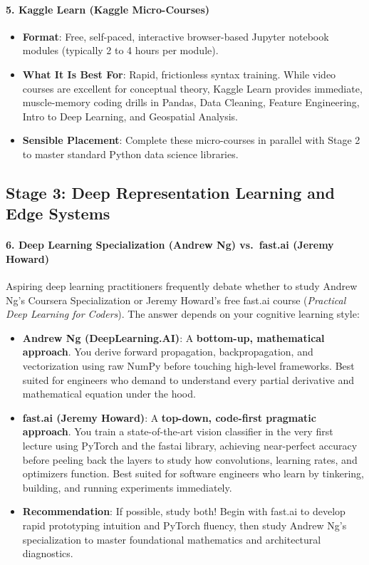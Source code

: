 \paragraph{5. Kaggle Learn (Kaggle Micro-Courses)}
\begin{itemize}
    \item \textbf{Format}: Free, self-paced, interactive browser-based Jupyter notebook modules (typically 2 to 4 hours per module).
    \item \textbf{What It Is Best For}: Rapid, frictionless syntax training. While video courses are excellent for conceptual theory, Kaggle Learn provides immediate, muscle-memory coding drills in Pandas, Data Cleaning, Feature Engineering, Intro to Deep Learning, and Geospatial Analysis.
    \item \textbf{Sensible Placement}: Complete these micro-courses in parallel with Stage 2 to master standard Python data science libraries.
\end{itemize}

\subsection{Stage 3: Deep Representation Learning and Edge Systems}

\paragraph{6. Deep Learning Specialization (Andrew Ng) vs.\ fast.ai (Jeremy Howard)}
Aspiring deep learning practitioners frequently debate whether to study Andrew Ng's Coursera Specialization or Jeremy Howard's free fast.ai course (\emph{Practical Deep Learning for Coders}). The answer depends on your cognitive learning style:
\begin{itemize}
    \item \textbf{Andrew Ng (DeepLearning.AI)}: A \textbf{bottom-up, mathematical approach}. You derive forward propagation, backpropagation, and vectorization using raw NumPy before touching high-level frameworks. Best suited for engineers who demand to understand every partial derivative and mathematical equation under the hood.
    \item \textbf{fast.ai (Jeremy Howard)}: A \textbf{top-down, code-first pragmatic approach}. You train a state-of-the-art vision classifier in the very first lecture using PyTorch and the fastai library, achieving near-perfect accuracy before peeling back the layers to study how convolutions, learning rates, and optimizers function. Best suited for software engineers who learn by tinkering, building, and running experiments immediately.
    \item \textbf{Recommendation}: If possible, study both! Begin with fast.ai to develop rapid prototyping intuition and PyTorch fluency, then study Andrew Ng's specialization to master foundational mathematics and architectural diagnostics.
\end{itemize}


